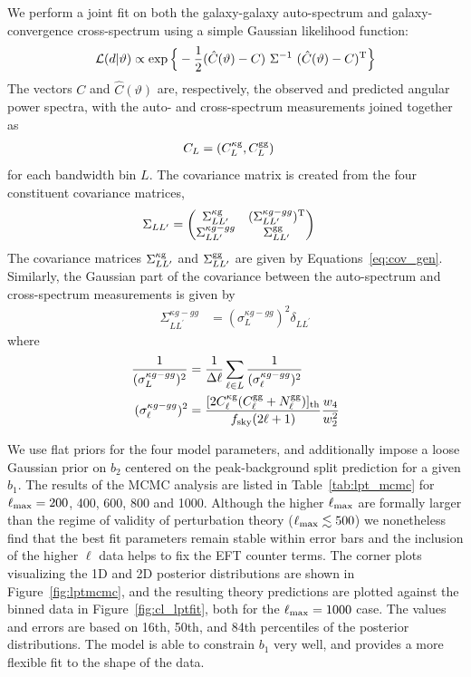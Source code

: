 \documentclass[a4paper,usenatbib]{mnras}
\begin{document}
We perform a joint fit on both the galaxy-galaxy auto-spectrum and galaxy-convergence cross-spectrum using a simple Gaussian likelihood function:
\begin{align}
    \mathcal{L}(d|\vartheta) \propto \exp {\Big \{ }-\frac{1}{2}(\hat{C}(\vartheta) - {C}) \ {\Sigma}^{-1} \ (\hat{C}(\vartheta) - {C})^{\rm T}{\Big \} }
\end{align}
The vectors $C$ and $\hat{C}(\vartheta)$ are, respectively, the observed and predicted angular power spectra, with the auto- and cross-spectrum measurements joined together as
\begin{align}
    {C_{L}} &= (C^{\rm \kappa g}_{L}, C^{\rm gg}_{L})
\end{align}
for each bandwidth bin $L$. The covariance matrix is created from the four constituent covariance matrices,
\begin{align}
    {\Sigma_{LL^{\prime}}} &= 
    \begin{pmatrix}
    \Sigma^{\rm \kappa g}_{LL^{\prime}} & (\Sigma^{\kappa g - gg}_{LL^{\prime}})^{\rm T} \\
    \Sigma^{\kappa g - gg}_{LL^{\prime}} & \Sigma^{\rm gg}_{LL^{\prime}}
    \end{pmatrix}
\end{align}
The covariance matrices $\Sigma^{\rm \kappa g}_{LL^{\prime}}$ and $\Sigma^{\rm gg}_{LL^{\prime}}$ are given by Equations~\ref{eq:cov_gen}. Similarly, the Gaussian part of the covariance between the auto-spectrum and cross-spectrum measurements is given by
\begin{align}
    \Sigma^{\kappa g - gg}_{LL^{\prime}} &=
     (\sigma_{L}^{\kappa g - gg})^2 \delta_{L L^{\prime}}
\end{align}
where
\begin{align}
    \frac{1}{(\sigma_{L}^{\kappa g - gg})^2} &= \frac{1}{\Delta \ell} \sum_{\ell \in L} \frac{1}{(\sigma_{\ell}^{\kappa g - gg})^2} \\
    (\sigma_{\ell}^{\kappa g - gg})^2 &= \frac{[2 C^{\rm \kappa g}_{\ell}(C^{\rm gg}_{\ell} + N^{\rm gg}_{\ell}) ]_{\rm th}}{f_{\rm sky}(2\ell + 1)}\frac{w_4}{w_2^2}
\end{align}

We use flat priors for the four model parameters, and additionally impose a loose Gaussian prior on $b_2$ centered on the peak-background split prediction for a given $b_1$. The results of the MCMC analysis are listed in Table~\ref{tab:lpt_mcmc} for $\ell_{\rm max} = 200$, 400, 600, 800 and 1000.  Although the higher $\ell_{\rm max}$ are formally larger than the regime of validity of perturbation theory ($\ell_{\rm max}\lesssim 500$) we nonetheless find that the best fit parameters remain stable within error bars and the inclusion of the higher $\ell$ data helps to fix the EFT counter terms. The corner plots visualizing the 1D and 2D posterior distributions are shown in Figure~\ref{fig:lptmcmc}, and the resulting theory predictions are plotted against the binned data in Figure~\ref{fig:cl_lptfit}, both for the $\ell_{\rm max} = 1000$ case. The values and errors are based on  16th, 50th, and 84th percentiles of the posterior distributions. The model is able to constrain $b_1$ very well, and provides a more flexible fit to the shape of the data.
\end{document}
